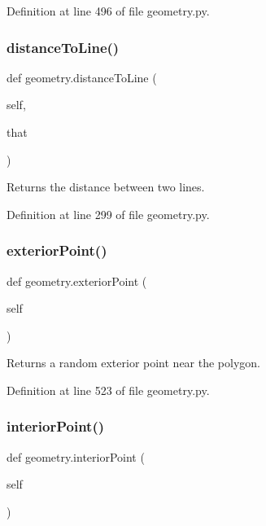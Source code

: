 Definition at line 496 of file geometry.\+py.

\mbox{\label{namespacegeometry_a96071e09708da91677cc86ea91705f5e}} 
\subsubsection{\texorpdfstring{distance\+To\+Line()}{distanceToLine()}}
{\footnotesize\ttfamily def geometry.\+distance\+To\+Line (\begin{DoxyParamCaption}\item[{}]{self,  }\item[{}]{that }\end{DoxyParamCaption})}

\begin{DoxyVerb}Returns the distance between two lines.\end{DoxyVerb}
 

Definition at line 299 of file geometry.\+py.

\mbox{\label{namespacegeometry_ac3bf912ad06b884d2c21a3f91cf7c392}} 
\subsubsection{\texorpdfstring{exterior\+Point()}{exteriorPoint()}}
{\footnotesize\ttfamily def geometry.\+exterior\+Point (\begin{DoxyParamCaption}\item[{}]{self }\end{DoxyParamCaption})}

\begin{DoxyVerb}Returns a random exterior point near the polygon.\end{DoxyVerb}
 

Definition at line 523 of file geometry.\+py.

\mbox{\label{namespacegeometry_ac7327d8cae2a771c06a0ded4c91ab4a7}} 
\subsubsection{\texorpdfstring{interior\+Point()}{interiorPoint()}}
{\footnotesize\ttfamily def geometry.\+interior\+Point (\begin{DoxyParamCaption}\item[{}]{self }\end{DoxyParamCaption})}

